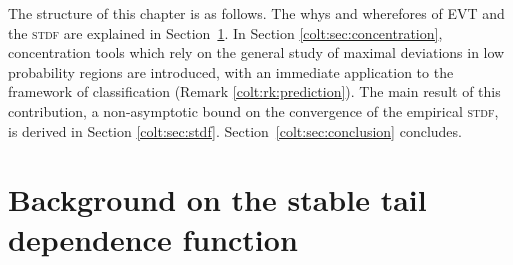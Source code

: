 The structure of this chapter is as follows. The whys and wherefores of
 \textsc{EVT} and the \textsc{stdf} are explained in
 Section~\ref{colt:sec:background}. In Section \ref{colt:sec:concentration},
 concentration tools which rely on the general study of maximal
 deviations in low probability regions are introduced, with an
 immediate application to the framework of classification (Remark
 \ref{colt:rk:prediction}). The main result of this contribution,  a
 non-asymptotic bound on the convergence of the empirical
 \textsc{stdf}, is derived in Section \ref{colt:sec:stdf}. Section~\ref{colt:sec:conclusion} concludes.

\section{Background on the stable tail dependence function}
\label{colt:sec:background}
